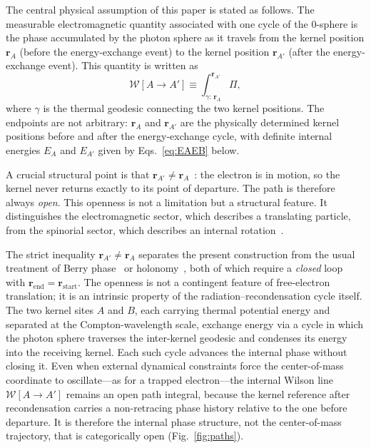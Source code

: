 \documentclass[%
 reprint, amsmath,amssymb, aps, prb, ]{revtex4-2}
\numberwithin{equation}{section}
\newcommand{\WL}{\mathcal{W}}
\begin{document}
The central physical assumption of this paper is stated as follows. The measurable electromagnetic quantity associated with one cycle of the 0-sphere is the phase accumulated by the photon sphere as it travels from the kernel position $\mathbf{r}_A$ (before the energy-exchange event) to the kernel position $\mathbf{r}_{A'}$ (after the energy-exchange event). This quantity is written as
\begin{equation}
\WL[A \to A'] \equiv \int_{\gamma:\,\mathbf{r}_A}^{\mathbf{r}_{A'}} \Pi,
\label{eq:WL}
\end{equation}
where $\gamma$ is the thermal geodesic connecting the two kernel positions. The endpoints are not arbitrary: $\mathbf{r}_A$ and $\mathbf{r}_{A'}$ are the physically determined kernel positions before and after the energy-exchange cycle, with definite internal energies $E_A$ and $E_{A'}$ given by Eqs.~\eqref{eq:EAEB} below.

A crucial structural point is that $\mathbf{r}_{A'} \neq \mathbf{r}_A$~\cite{hanamura47}: the electron is in motion, so the kernel never returns exactly to its point of departure. The path is therefore always \emph{open}. This openness is not a limitation but a structural feature. It distinguishes the electromagnetic sector, which describes a translating particle, from the spinorial sector, which describes an internal rotation~\cite{hanamura26,hanamura45}.

The strict inequality $\mathbf{r}_{A'}\neq\mathbf{r}_A$ separates the present construction from the usual treatment of Berry phase~\cite{Berry1984} or holonomy~\cite{WuYang1975}, both of which require a \emph{closed} loop with $\mathbf{r}_{\text{end}}=\mathbf{r}_{\text{start}}$. The openness is not a contingent feature of free-electron translation; it is an intrinsic property of the radiation--recondensation cycle itself. The two kernel sites $A$ and $B$, each carrying thermal potential energy and separated at the Compton-wavelength scale, exchange energy via a cycle in which the photon sphere traverses the inter-kernel geodesic and condenses its energy into the receiving kernel. Each such cycle advances the internal phase without closing it. Even when external dynamical constraints force the center-of-mass coordinate to oscillate---as for a trapped electron---the internal Wilson line $\WL[A\to A']$ remains an open path integral, because the kernel reference after recondensation carries a non-retracing phase history relative to the one before departure. It is therefore the internal phase structure, not the center-of-mass trajectory, that is categorically open (Fig.~\ref{fig:paths}).
\end{document}

